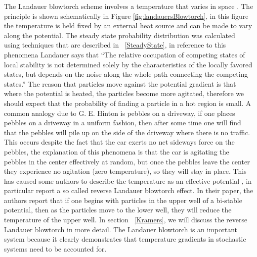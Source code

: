 The Landauer blowtorch scheme involves a temperature that varies in space \cite{Landauer1988}. The principle is shown schematically in Figure \ref{fig:landauersBlowtorch}, in this figure the temperature is held fixed by an external heat source and can be made to vary along the potential. The steady state probability distribution was calculated using techniques that are described in ~\autoref{SteadyState}, in reference to this phenomena Landauer says that \cite{Landauer1988}  ``The relative occupation of competing states of local stability is not determined solely by the characteristics of the locally favored states, but depends on the noise along the whole path connecting the competing states.'' The reason that particles move against the potential gradient is that where the potential is heated, the particles become more agitated, therefore we should expect that the probability of finding a particle in a hot region is small. A common analogy due to G. E. Hinton is pebbles on a driveway, if one places pebbles on a driveway in a uniform fashion, then after some time one will find that the pebbles will pile up on the side of the driveway where there is no traffic. This occurs despite the fact that the car exerts no net sideways force on the pebbles, the explanation of this phenomena is that the car is agitating the pebbles in the center effectively at random, but once the pebbles leave the center they experience no agitation (zero temperature), so they will stay in place. This has caused some authors to describe the temperature as an effective potential \cite{Gardiner2009, Kampen1988}, in particular \cite{DasDasBarikEtAl2015} report a so called reverse Landauer blowtorch effect. In their paper, the authors report that if one begins with particles in the upper well of a bi-stable potential, then as the particles move to the lower well, they will reduce the temperature of the upper well. In section ~\autoref{Kramers}, we will discuss the reverse Landauer blowtorch in more detail. The Landauer blowtorch is an important system because it clearly demonstrates that temperature gradients in stochastic systems need to be accounted for.

